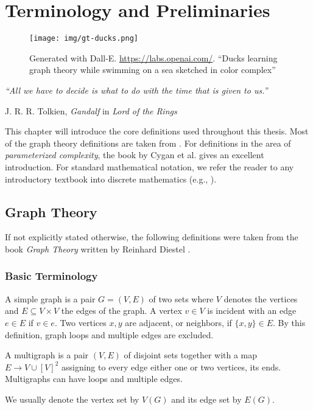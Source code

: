 \chapter{Terminology and Preliminaries}\label{ch:prelim}

\vspace*{-50pt}

\begin{figure}[ht]
        \texttt{[image: img/gt-ducks.png]}
        \captionsetup{textformat=empty,labelformat=blank}
        \caption[Generated with Dalle-E. Knowledge Cutoff 09-2022]{Generated with Dall-E. \url{https://labs.openai.com/}. ``Ducks learning graph theory while swimming on a sea sketched in color complex''}
\end{figure}

\epigraph{\itshape ``All we have to decide is what to do with the time that is given to us.''}{J. R. R. Tolkien, \textit{Gandalf} in \textit{Lord of the Rings}}


This chapter will introduce the core definitions used throughout this thesis. 
Most of the graph theory definitions are taken from \cite{Diekert2005}. 
For definitions in the area of \textit{parameterized complexity}, the book by Cygan et al. \cite{Cygan2015} gives an excellent introduction.
For standard mathematical notation, we refer the reader to any introductory textbook into discrete mathematics (e.g., \cite{Rosen2012}).
\section{Graph Theory}

If not explicitly stated otherwise, the following definitions were taken from the book \textit{Graph Theory} written by Reinhard Diestel \cite{diestel10}.

\subsection{Basic Terminology}

\begin{definition}[Graph]
    A simple graph is a pair $G = (V, E)$ of two sets where $V$ denotes the vertices and $E \subseteq V \times V$ the edges of the graph.  A vertex $v \in V$ is incident with an edge $e \in E$ if $v \in e$. Two vertices $x, y$ are adjacent, or neighbors, if $\{x,y \} \in E$. By this definition, graph loops and multiple edges are excluded.
    
    A multigraph is a pair $(V, E)$ of disjoint sets together with a map $E \rightarrow V \cup [V]^2$ assigning to every edge either one or two vertices, its ends. Multigraphs can have loops and multiple edges.
    
    We usually denote the vertex set by $V(G)$ and its edge set by $E(G)$.
\end{definition}

